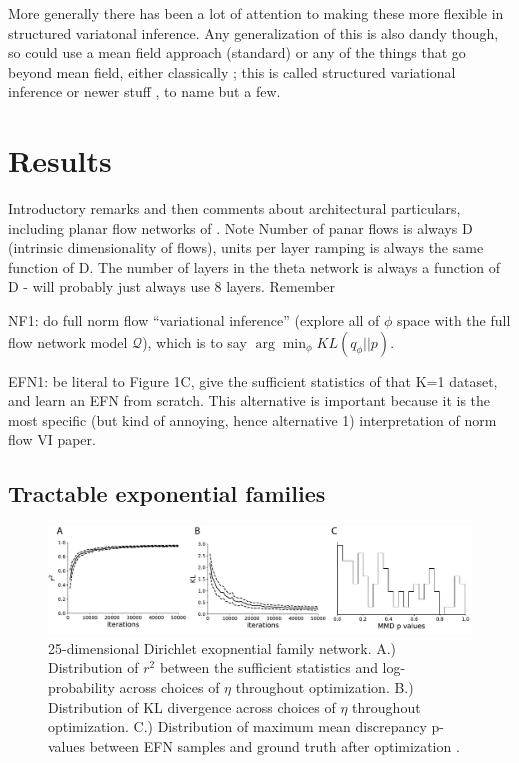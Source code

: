 \documentclass{article}
\begin{document}
 
 More generally there has been a lot of attention to making these more flexible in structured variatonal inference.  Any generalization of this is also dandy though, so could use a mean field approach (standard) or any of the things that go beyond mean field, either classically \cite{saul1996exploiting, barber1999tractable}; this is called structured variational inference or newer stuff  \cite{hoffman2015stochastic} \cite{tran2015copula}, to name but a few.

 


  
\section{Results}

Introductory remarks and then comments about architectural particulars, including planar flow networks of \cite{rezende2015variational}. Note Number of panar flows is always D (intrinsic dimensionality of flows), units per layer ramping is always the same function of D.  The number of layers in the theta network is always a function of D - will probably just always use 8 layers.
Remember 

NF1: do full norm flow ``variational inference'' (explore all of $\phi$ space with the full flow network model $\mathcal{Q}$), which is to say $\arg\min_\phi KL(q_\phi || p)$.  

EFN1:  be literal to Figure 1C, give the sufficient statistics of that K=1 dataset, and learn an EFN from scratch.  This alternative is important because it is the most specific (but kind of annoying, hence alternative 1) interpretation of norm flow VI paper.  

\subsection{Tractable exponential families}

 \begin{figure}
  \centering
\includegraphics[scale=0.46]{figs/fig2/fig2.pdf}
  \caption{25-dimensional Dirichlet exopnential family network.  A.) Distribution of $r^2$ between the sufficient statistics and log-probability across choices of $\eta$ throughout optimization.  B.) Distribution of KL divergence across choices of $\eta$ throughout optimization.  C.) Distribution of maximum mean discrepancy p-values between EFN samples and ground truth after optimization \cite{gretton2012kernel}.}
\end{figure}
\end{document}

